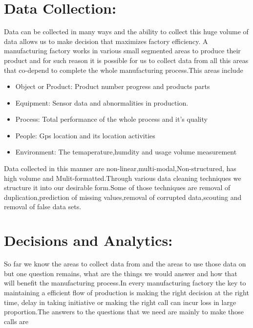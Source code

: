 \documentclass{article}
\begin{document}
\begin{normalsize}
        \section{Data Collection:}
        	Data can be collected in many ways and the ability to collect this huge volume of data allows us to make decision that maximizes factory efficiency. A manufacturing factory works in  various small segmented areas to produce their product and for such reason it is possible for us to collect data from all this areas that co-depend to complete the whole manufacturing process.This areas include 
        	     \begin{itemize}
        
\item{Object or Product: Product number progress and products parts}
\item{Equipment: Sensor data and abnormalities in production. 
} 
\item{Process: Total performance of the whole process and it's quality}
\item{People: Gps location and its location activities}
\item{Environment: The temaperature,humdity and usage volume measurement}
				\end{itemize}
			Data collected in this manner are non-linear,multi-modal,Non-structured, has high volume and Mulit-formatted.Through various data cleaning techniques we structure it into our desirable form.Some of those techniques are removal of duplication,prediction of missing values,removal of corrupted data,scouting and removal of false data sets.
				
  		\section{Decisions and Analytics:}
  		So far we know the areas to collect data from and the areas to use those data on but one question remains, what are the things we would answer and how that will benefit the manufacturing process.In every manufacturing factory the key to maintaining a efficient flow of production is making the right decision at the right time, delay in taking initiative or making the right call can incur loss in large proportion.The answers to the questions that we need are mainly to make those calls are 
  		
  		\begin{itemize}
        

\end{itemize}
\end{normalsize}
\end{document}

